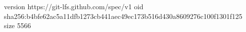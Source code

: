 version https://git-lfs.github.com/spec/v1
oid sha256:b4bfe62ac5a11dfb1273cb441aec49ec173b516d430a8609276c100f1301f125
size 5566
